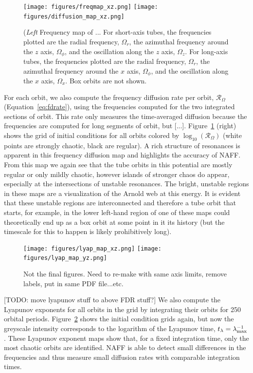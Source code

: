 \documentclass[letterpaper,12pt,preprint]{aastex}
\newcommand{\fdrate}{\mathcal{R}_\Omega}
\begin{document}
\begin{figure}[h]
\centering
	\texttt{[image: figures/freqmap\_xz.png]}
	\texttt{[image: figures/diffusion\_map\_xz.png]}
	\caption{(\emph{Left} Frequency map of ... For short-axis tubes, the frequencies plotted are the radial frequency, $\Omega_r$, the azimuthal frequency around the $z$ axis, $\Omega_\phi$, and the oscillation along the $z$ axis, $\Omega_z$. For long-axis tubes, the frequencies plotted are the radial frequency, $\Omega_r$, the azimuthal frequency around the $x$ axis, $\Omega_\phi$, and the oscillation along the $x$ axis, $\Omega_x$. Box orbits are not shown.} 
	\label{fig:freqmap}
\end{figure}

For each orbit, we also compute the frequency diffusion rate per orbit, $\fdrate$ (Equation~\ref{eq:fdrate}), using the frequencies computed for the two integrated sections of orbit. This rate only measures the time-averaged diffusion because the frequencies are computed for long segments of orbit, but \cite{valluri??} [...]. Figure~\ref{fig:freqmap} (right) shows the grid of initial conditions for all orbits colored by $\log_{10}(\fdrate)$ (white points are strongly chaotic, black are regular). A rich structure of resonances is apparent in this frequency diffusion map and highlights the accuracy of NAFF. From this map we again see that the tube orbits in this potential are mostly regular or only mildly chaotic, however islands of stronger chaos do appear, especially at the intersections of unstable resonances. The bright, unstable regions in these maps are a visualization of the Arnold web at this energy. It is evident that these unstable regions are interconnected and therefore a tube orbit that starts, for example, in the lower left-hand region of one of these maps could theoretically end up as a box orbit at some point in it its history (but the timescale for this to happen is likely prohibitively long). 

\begin{figure}[!h]
\centering
	\texttt{[image: figures/lyap\_map\_xz.png]}
	\texttt{[image: figures/lyap\_map\_yz.png]}
	\caption{Not the final figures. Need to re-make with same axis limits, remove labels, put in same PDF file...etc.} 
	\label{fig:lyapmap}
\end{figure}

[TODO: move lyapunov stuff to above FDR stuff?]
We also compute the Lyapunov exponents for all orbits in the grid by integrating their orbits for 250 orbital periods. Figure~\ref{fig:lyapmap} shows the initial condition grids again, but now the greyscale intensity corresponds to the logarithm of the Lyapunov time, $t_\lambda = \lambda_{\rm max}^{-1}$. These Lyapunov exponent maps show that, for a fixed integration time, only the most chaotic orbits are identified. NAFF is able to detect small differences in the frequencies and thus measure small diffusion rates with comparable integration times.
\end{document}
